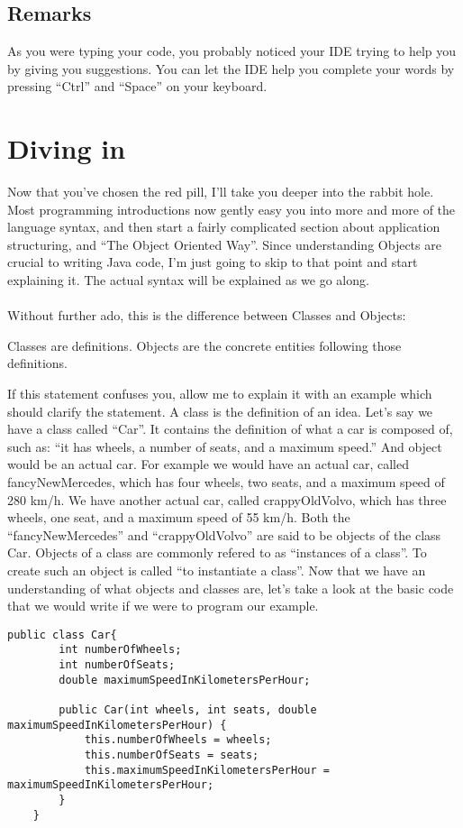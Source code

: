 \documentclass[11pt,fleqn]{book} %
\begin{document}
\subsection{Remarks}

\begin{remark}
	As you were typing your code, you probably noticed your IDE trying to help you by giving you suggestions. You can let the IDE help you complete your words by pressing ``Ctrl'' and ``Space'' on your keyboard.
\end{remark}

\newpage
\section{Diving in}

\begin{remark}
Now that you've chosen the red pill, I'll take you deeper into the rabbit hole. Most programming introductions now gently easy you into more and more of the language syntax, and then start a fairly complicated section about application structuring, and ``The Object Oriented Way''. Since understanding Objects are crucial to writing Java code, I'm just going to skip to that point and start explaining it. The actual syntax will be explained as we go along.
\end{remark}

\paragraph{}
Without further ado, this is the difference between Classes and Objects:
\begin{theorem}
Classes are definitions. Objects are the concrete entities following those definitions.
\end{theorem}
If this statement confuses you, allow me to explain it with an example which should clarify the statement. 
A class is the definition of an idea. Let's say we have a class called ``Car''. It contains the definition of what a car is composed of, such as: ``it has wheels, a number of seats, and a maximum speed.'' And object would be an actual car. For example we would have an actual car, called fancyNewMercedes, which has four wheels, two seats, and a maximum speed of 280 km/h. We have another actual car, called crappyOldVolvo, which has three wheels, one seat, and a maximum speed of 55 km/h. Both the ``fancyNewMercedes'' and ``crappyOldVolvo'' are said to be objects of the class Car. Objects of a class are commonly refered to as ``instances of a class''. To create such an object is called ``to instantiate a class''. 
Now that we have an understanding of what objects and classes are, let's take a look at the basic code that we would write if we were to program our example.
\begin{lstlisting}[caption=Car.java]
	public class Car{
		int numberOfWheels;
		int numberOfSeats;
		double maximumSpeedInKilometersPerHour;
		
		public Car(int wheels, int seats, double maximumSpeedInKilometersPerHour) {
			this.numberOfWheels = wheels;
			this.numberOfSeats = seats;
			this.maximumSpeedInKilometersPerHour = maximumSpeedInKilometersPerHour;
		}
	}
\end{lstlisting}
\end{document}
